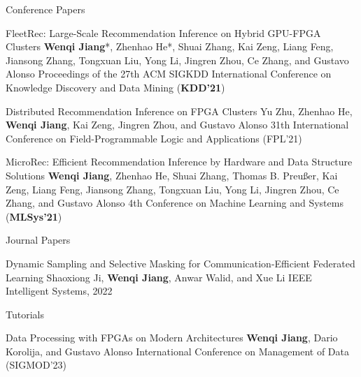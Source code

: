 \begin{rSection}{Conference Papers}
\begin{enumerate}[label={[\arabic*]}]
\item 
\begin{Pub}{FleetRec: Large-Scale Recommendation Inference on Hybrid GPU-FPGA Clusters}
{\textbf{Wenqi Jiang}*, Zhenhao He*, Shuai Zhang, Kai Zeng, Liang Feng, Jiansong Zhang, Tongxuan Liu, Yong Li, Jingren Zhou, Ce Zhang, and Gustavo Alonso}
{Proceedings of the 27th ACM SIGKDD International Conference on Knowledge Discovery and Data Mining (\textbf{KDD'21})}
\end{Pub}

\item 
\begin{Pub}{Distributed Recommendation Inference on FPGA Clusters}
{Yu Zhu, Zhenhao He, \textbf{Wenqi Jiang}, Kai Zeng, Jingren Zhou, and Gustavo Alonso}
{31th International Conference on Field-Programmable Logic and Applications (FPL'21)}
\end{Pub}

\item 
\begin{Pub}{MicroRec: Efficient Recommendation Inference by Hardware and Data Structure Solutions}
{\textbf{Wenqi Jiang}, Zhenhao He, Shuai Zhang, Thomas B. Preußer, Kai Zeng, Liang Feng, Jiansong Zhang, Tongxuan Liu, Yong Li, Jingren Zhou, Ce Zhang, and Gustavo Alonso}
{4th Conference on Machine Learning and Systems (\textbf{MLSys'21})}
\end{Pub}\end{enumerate}
\end{rSection}



\begin{rSection}{Journal Papers}
\begin{enumerate}[label={[\arabic*]}]

\item 
\begin{Pub}{Dynamic Sampling and Selective Masking for Communication-Efficient Federated Learning}
{Shaoxiong Ji, \textbf{Wenqi Jiang}, Anwar Walid, and Xue Li}
{IEEE Intelligent Systems, 2022 }
\end{Pub}\end{enumerate}
\end{rSection}



\begin{rSection}{Tutorials}

\begin{enumerate}[label={[\arabic*]}]

\item 
\begin{Pub}{Data Processing with FPGAs on Modern Architectures}
{\textbf{Wenqi Jiang}, Dario Korolija, and Gustavo Alonso}
{International Conference on Management of Data (SIGMOD'23)}
\end{Pub}\end{enumerate}
\end{rSection}

